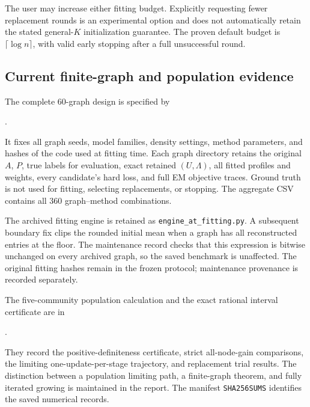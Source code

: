 The user may increase either fitting budget. Explicitly requesting fewer replacement rounds is an experimental option and does not automatically retain the stated general-$K$ initialization guarantee. The proven default budget is $\lceil\log n\rceil$, with valid early stopping after a full unsuccessful round.

\subsection{Current finite-graph and population evidence}
The complete 60-graph design is specified by
\begin{center}
\small{}.
\end{center}
It fixes all graph seeds, model families, density settings, method parameters, and hashes of the code used at fitting time. Each graph directory retains the original $A$, $P$, true labels for evaluation, exact retained $(U,\Lambda)$, all fitted profiles and weights, every candidate's hard loss, and full EM objective traces. Ground truth is not used for fitting, selecting replacements, or stopping. The aggregate CSV contains all 360 graph--method combinations.

The archived fitting engine is retained as \texttt{engine\_at\_fitting.py}. A subsequent boundary fix clips the rounded initial mean when a graph has all reconstructed entries at the floor. The maintenance record checks that this expression is bitwise unchanged on every archived graph, so the saved benchmark is unaffected. The original fitting hashes remain in the frozen protocol; maintenance provenance is recorded separately.

The five-community population calculation and the exact rational interval certificate are in
\begin{center}
\small{}.
\end{center}
They record the positive-definiteness certificate, strict all-node-gain comparisons, the limiting one-update-per-stage trajectory, and replacement trial results. The distinction between a population limiting path, a finite-graph theorem, and fully iterated growing is maintained in the report. The manifest \texttt{SHA256SUMS} identifies the saved numerical records.

